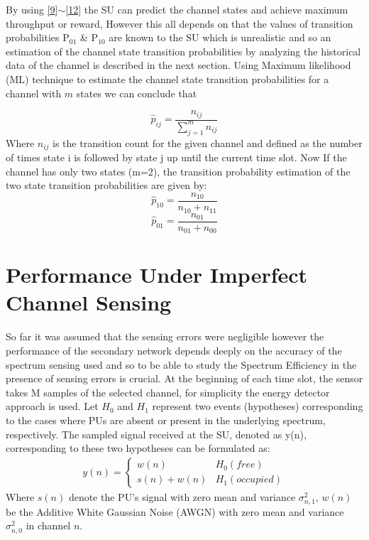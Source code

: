\documentclass[twocolumn]{el-author}
\begin{document}
	By using \ref{9}$\sim$\ref{12} the SU can predict the channel states and achieve maximum throughput or reward, However this all depends on that the values of transition probabilities P${}_{01}$ \& P${}_{10}$ are known to the SU which is unrealistic and so an estimation of the channel state transition probabilities by analyzing the historical data of the channel is described in the next section. Using  Maximum likelihood (ML)  technique \cite{Teodorescu2009,Craig1998}to estimate the channel state transition probabilities for a channel with $m$ states  we can conclude that
	
	\begin{equation}\label{23}
	{\hat{p}}_{ij}=\frac{n_{ij}}{\sum^m_{j=1}{n_{ij}}}
	\end{equation}
	Where ${n}_{ij}$ is the transition count for the given channel and  defined as the number of times state i is followed by state j up until the current time slot. Now If the channel has only two states (m=2), the transition probability estimation of the two state transition probabilities are given by:
	\begin{equation}\label{24}
	{\hat{p}}_{10}=\frac{n_{10}}{n_{10}+n_{11}}
	\end{equation}
	\begin{equation}\label{25}
	{\hat{p}}_{01}=\frac{n_{01}}{n_{01}+n_{00}}
	\end{equation}
	
	
	\section{Performance Under Imperfect Channel Sensing}
	So far it was assumed that the sensing errors were negligible however the performance of the secondary network depends deeply on the accuracy of the spectrum sensing used \cite{Yucek:2009:SSS:2211326.2211414} and so to be able to study the Spectrum Efficiency in the presence of sensing errors is crucial.
	At the beginning of each time slot, the sensor takes M samples of the selected channel, for simplicity the energy detector approach is used. Let $ H_0 $ and $H_1$ represent two events (hypotheses) corresponding to the cases where PUs are absent or present in the underlying spectrum, respectively. The sampled signal received at the SU, denoted as y(n), corresponding to these two hypotheses can be formulated as: 
	\begin{align}\label{kondolies}
	y(n)=\left\{\begin{matrix}
	w(n) & H_0(free)\\ 
	s(n)+w(n) & H_1 (occupied)
	\end{matrix}\right.
	\end{align}
	Where $s(n)$  denote the PU's signal with zero mean and variance $\sigma^2_{n,1}$, $ w(n) $ be the Additive White Gaussian Noise (AWGN) with zero mean and variance $\sigma^2_{n,0}$ in channel $ n $.
	
\end{document}
